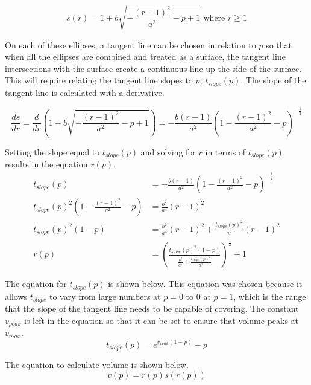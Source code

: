\begin{equation}
    s(r)=1+b\sqrt{-\frac{(r-1)^2}{a^2}-p+1} \text{ where }r\ge1
\end{equation}

On each of these ellipses, a tangent line can be chosen in relation to $p$ so that when all the ellipses are combined and treated as a surface, the tangent line intersections with the surface create a continuous line up the side of the surface. This will require relating the tangent line slopes to $p$, $t_{slope}(p)$. The slope of the tangent line is calculated with a derivative.

\[ \frac{ds}{dr}=\frac{d}{dr}\left( 1+b\sqrt{-\frac{(r-1)^2}{a^2}-p+1}\right)=-\frac{b(r-1)}{a^2}\left( 1-\frac{(r-1)^2}{a^2}-p \right)^{-\frac{1}{2}} \]

Setting the slope equal to $t_{slope}(p)$ and solving for $r$ in terms of $t_{slope}(p)$ results in the equation $r(p)$.
\begin{equation}
    \begin{split}
        t_{slope}(p)&=-\frac{b(r-1)}{a^2}\left( 1-\frac{(r-1)^2}{a^2}-p\right)^{-\frac{1}{2}}\\
        t_{slope}(p)^2\left( 1-\frac{(r-1)^2}{a^2}-p \right)&=\frac{b^2}{a^4}(r-1)^2\\
        t_{slope}(p)^2(1-p)&=\frac{b^2}{a^4}(r-1)^2+\frac{t_{slope}(p)^2}{a^2}(r-1)^2\\
        r(p)&=\left(\frac{t_{slope}(p)^2(1-p)}{\frac{b^2}{a^4}+\frac{t_{slope}(p)^2}{a^2}}\right)^{\frac{1}{2}}+1
    \end{split}
\end{equation}

The equation for $t_{slope}(p)$ is shown below. This equation was chosen because it allows $t_{slope}$ to vary from large numbers at $p=0$ to $0$ at $p=1$, which is the range that the slope of the tangent line needs to be capable of covering. The constant $v_{peak}$ is left in the equation so that it can be set to ensure that volume peaks at $v_{max}$.
\begin{equation}
    t_{slope}(p)=e^{v_{peak}(1-p)}-p
\end{equation}

The equation to calculate volume is shown below.
\begin{equation}
    v(p)=r(p)s(r(p))
\end{equation}


